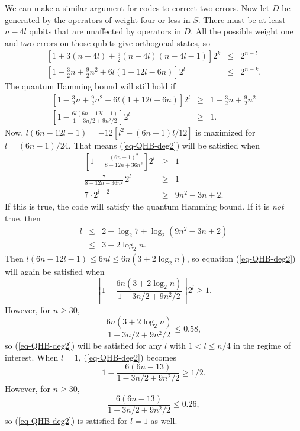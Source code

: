 \documentclass{report}
\begin{document}
We can make a similar argument for codes to correct two errors.  Now let $D$ 
be generated by the operators of weight four or less in $S$.  There must be 
at least $n-4l$ qubits that are unaffected by operators in $D$.  All the 
possible weight one and two errors on those qubits give orthogonal states, so
\begin{eqnarray}
\left[1 + 3(n-4l) + \frac{9}{2} (n-4l) (n-4l-1)\right] 2^k & \leq & 2^{n-l} \\
\left[1 - \frac{3}{2} n + \frac{9}{2} n^2 + 6 l (1 + 12 l - 6 n)\right] 2^l & \leq & 2^{n-k}.
\end{eqnarray}
The quantum Hamming bound will still hold if
\begin{eqnarray}
\left[1 - \frac{3}{2}n + \frac{9}{2} n^2 + 6 l (1 + 12 l - 6 n)\right] 2^l & 
\geq & 1 - \frac{3}{2}n + \frac{9}{2} n^2 \\
\left[ 1 - \frac{6l (6n - 12 l - 1)}{1 - 3n/2 + 9n^2/2} \right] 2^l & \geq & 1.
\label{eq-QHB-deg2}
\end{eqnarray}
Now, $l (6n - 12 l - 1) = -12 [l^2 - (6n-1) l /12]$ is maximized for $l = (6n-
1)/24$.  That means (\ref{eq-QHB-deg2}) will be satisfied when
\begin{eqnarray}
\left[ 1 - \frac{(6n - 1)^2}{8 - 12n + 36n^2} \right] 2^l & \geq & 1 \\
\frac{7}{8 - 12n + 36n^2}\,2^l & \geq & 1 \\
7 \cdot 2^{l-2} & \geq & 9n^2 - 3n + 2.
\end{eqnarray}
If this is true, the code will satisfy the quantum Hamming bound.  If it is 
{\em not} true, then
\begin{eqnarray}
l & \leq & 2 - \log_2 7 + \log_2 (9n^2 - 3n + 2) \\
& \leq & 3 + 2 \log_2 n.
\end{eqnarray}
Then $l (6n - 12l - 1) \leq 6 n l \leq 6 n (3 + 2 \log_2 n)$, so equation 
(\ref{eq-QHB-deg2}) will again be satisfied when
\begin{equation}
\left[ 1 - \frac{6 n (3 + 2 \log_2 n)}{1 - 3n/2 + 9n^2/2} \right] 2^l \geq 1.
\end{equation}
However, for $n \geq 30$,
\begin{equation}
\frac{6 n (3 + 2 \log_2 n)}{1 - 3n/2 + 9n^2/2} \leq 0.58,
\end{equation}
so (\ref{eq-QHB-deg2}) will be satisfied for any $l$ with $1 < l \leq n/4$ 
in the regime of interest.  When $l=1$, (\ref{eq-QHB-deg2}) becomes
\begin{equation}
1 - \frac{6 (6n - 13)}{1 - 3n/2 + 9n^2/2} \geq 1/2.
\end{equation}
However, for $n \geq 30$,
\begin{equation}
\frac{6 (6n - 13)}{1 - 3n/2 + 9n^2/2} \leq 0.26,
\end{equation}
so (\ref{eq-QHB-deg2}) is satisfied for $l=1$ as well.
\end{document}

